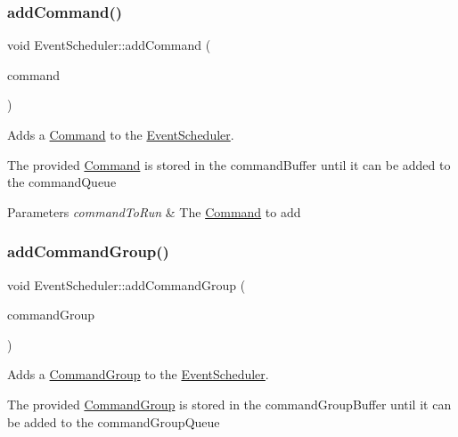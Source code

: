 \subsubsection{\texorpdfstring{addCommand()}{addCommand()}}
{\footnotesize\ttfamily void Event\+Scheduler\+::add\+Command (\begin{DoxyParamCaption}\item[{\mbox{\hyperlink{classlib_iterative_robot_1_1_command}{Command}} $\ast$}]{command }\end{DoxyParamCaption})}



Adds a \mbox{\hyperlink{classlib_iterative_robot_1_1_command}{Command}} to the \mbox{\hyperlink{classlib_iterative_robot_1_1_event_scheduler}{Event\+Scheduler}}. 

The provided \mbox{\hyperlink{classlib_iterative_robot_1_1_command}{Command}} is stored in the command\+Buffer until it can be added to the command\+Queue


\begin{DoxyParams}{Parameters}
{\em command\+To\+Run} & The \mbox{\hyperlink{classlib_iterative_robot_1_1_command}{Command}} to add \\
\hline
\end{DoxyParams}
\mbox{\label{classlib_iterative_robot_1_1_event_scheduler_a0f4f7e7bace3dfd5156e692b2f68d6df}} 
\subsubsection{\texorpdfstring{addCommandGroup()}{addCommandGroup()}}
{\footnotesize\ttfamily void Event\+Scheduler\+::add\+Command\+Group (\begin{DoxyParamCaption}\item[{\mbox{\hyperlink{classlib_iterative_robot_1_1_command_group}{Command\+Group}} $\ast$}]{command\+Group }\end{DoxyParamCaption})}



Adds a \mbox{\hyperlink{classlib_iterative_robot_1_1_command_group}{Command\+Group}} to the \mbox{\hyperlink{classlib_iterative_robot_1_1_event_scheduler}{Event\+Scheduler}}. 

The provided \mbox{\hyperlink{classlib_iterative_robot_1_1_command_group}{Command\+Group}} is stored in the command\+Group\+Buffer until it can be added to the command\+Group\+Queue


